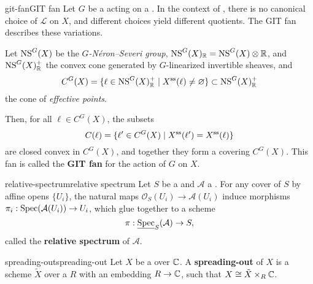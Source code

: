 \begin{topic}{git-fan}{GIT fan}
    Let $G$ be a  acting on a  . In the context of , there is no canonical choice of   $\mathcal{L}$ on $X$, and different choices yield different quotients. The GIT fan describes these variations.
    
    Let $\textup{NS}^G(X)$ be the \textit{$G$-Néron--Severi group}, $\textup{NS}^G(X)_{\mathbb{R}} = \textup{NS}^G(X) \otimes \mathbb{R}$, and $\textup{NS}^G(X)_{\mathbb{R}}^+$ the convex cone generated by  $G$-linearized invertible sheaves, and
    \[ C^G(X) = \{ \ell \in \textup{NS}^G(X)_{\mathbb{R}}^+ \mid X^\textup{ss}(\ell) \ne \varnothing \} \subset \textup{NS}^G(X)_{\mathbb{R}}^+ \]
    the cone of \textit{effective points}.
    
    Then, for all $\ell \in C^G(X)$, the subsets
    \[ C(\ell) = \{ \ell' \in C^G(X) \mid X^\textup{ss}(\ell') = X^\textup{ss}(\ell) \} \]
    are closed convex  in $C^G(X)$, and together they form a  covering $C^G(X)$. This fan is called the \textbf{GIT fan} for the action of $G$ on $X$.
\end{topic}

\begin{topic}{relative-spectrum}{relative spectrum}
    Let $S$ be a  and $\mathcal{A}$ a  . For any cover of $S$ by affine opens $\{ U_i \}$, the natural maps $\mathcal{O}_S(U_i) \to \mathcal{A}(U_i)$ induce morphisms $\pi_i : \operatorname{Spec}(\mathcal{A}(U_i)) \to U_i$, which glue together to a scheme
    \[ \pi : \underline{\operatorname{Spec}}_S(\mathcal{A}) \to S , \]
    called the \textbf{relative spectrum} of $\mathcal{A}$.
\end{topic}

\begin{topic}{spreading-out}{spreading-out}
    Let $X$ be a  over $\mathbb{C}$. A \textbf{spreading-out} of $X$ is a  scheme $\tilde{X}$ over a  $R$ with an embedding $R \to \mathbb{C}$, such that $X \cong \tilde{X} \times_R \mathbb{C}$.
\end{topic}

